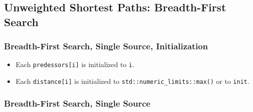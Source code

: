 {\small
      
}



\subsection{Unweighted Shortest Paths: Breadth-First Search}

\subsubsection{Breadth-First Search, Single Source, Initialization}

{\small
      
}

\begin{itemdescr}
      \effects
      \begin{itemize}
            \item
                  Each \lstinline{predessors[i]} is initialized to \lstinline{i}.
            \item Each
                  \lstinline{distance[i]} is initialized to \lstinline{std::numeric_limits::max()}
                  or to \lstinline{init}.
      \end{itemize}
\end{itemdescr}


\subsubsection{Breadth-First Search, Single Source}


{\small
      
}

